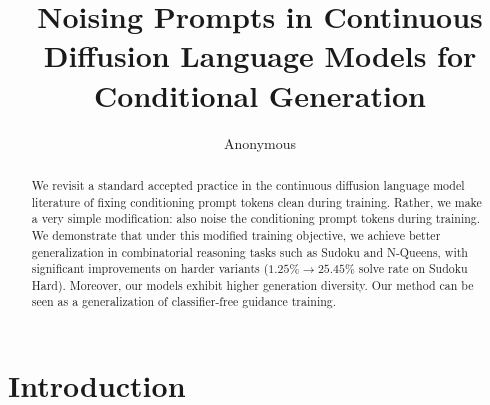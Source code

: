 \documentclass{article}
\title{Noising Prompts in Continuous Diffusion Language Models for Conditional Generation}
\author{Anonymous}
\begin{document}
\ifcolmsubmission
\linenumbers
\fi

\maketitle

\begin{abstract}
We revisit a standard accepted practice in the continuous diffusion language model
literature of fixing conditioning prompt tokens clean during training.
Rather, we make a very simple modification: also noise the conditioning prompt tokens during training.
We demonstrate that under this modified training objective, we achieve better generalization 
in combinatorial reasoning tasks such as Sudoku and N-Queens, with significant improvements on harder
variants ($1.25\% \to 25.45\%$ solve rate on Sudoku Hard). Moreover, our models exhibit higher generation
diversity. Our method can be seen as a generalization of classifier-free guidance training. 

\end{abstract}

\section{Introduction}
\label{sec:intro}
\end{document}
